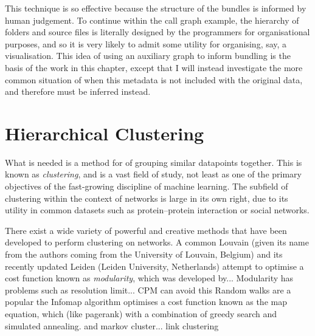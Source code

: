 This technique is so effective because the structure of the bundles is informed by human judgement. To continue within the call graph example, the hierarchy of folders and source files is literally designed by the programmers for organisational purposes, and so it is very likely to admit some utility for organising, say, a visualisation.
This idea of using an auxiliary graph to inform bundling is the basis of the work in this chapter, except that I will instead investigate the more common situation of when this metadata is not included with the original data, and therefore must be inferred instead.

\section{Hierarchical Clustering}
What is needed is a method for of grouping similar datapoints together. This is known as \textit{clustering}, and is a vast field of study, not least as one of the primary objectives of the fast-growing discipline of machine learning. The subfield of clustering within the context of networks is large in its own right, due to its utility in common datasets such as protein--protein interaction or social networks.

There exist a wide variety of powerful and creative methods that have been developed to perform clustering on networks. A common 
Louvain (given its name from the authors coming from the University of Louvain, Belgium) and its recently updated Leiden (Leiden University, Netherlands) attempt to optimise a cost function known as \textit{modularity}, which was developed by...
Modularity has problems such as resolution limit... CPM can avoid this
Random walks are a popular the Infomap algorithm optimises a cost function known as the map equation, which (like pagerank) with a combination of greedy search and simulated annealing.
and markov cluster...
link clustering

